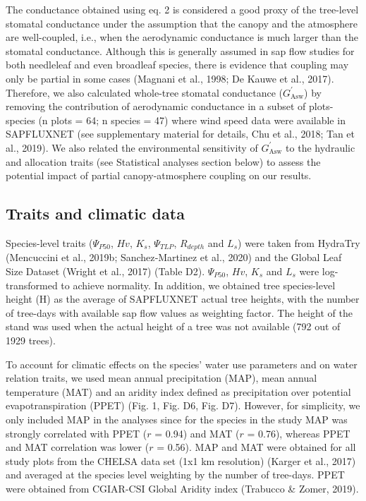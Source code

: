 \documentclass[11pt,twoside]{reedthesis}
\begin{document}
The conductance obtained using eq. 2 is considered a good proxy of the
tree-level stomatal conductance under the assumption that the canopy and
the atmosphere are well-coupled, i.e., when the aerodynamic conductance
is much larger than the stomatal conductance. Although this is generally
assumed in sap flow studies for both needleleaf and even broadleaf
species, there is evidence that coupling may only be partial in some
cases (Magnani et al., 1998; De Kauwe et al., 2017). Therefore, we also
calculated whole-tree stomatal conductance (\(G_{\text{Asw}}^{'}\)) by
removing the contribution of aerodynamic conductance in a subset of
plots-species (n plots = 64; n species = 47) where wind speed data were
available in SAPFLUXNET (see supplementary material for details, Chu et
al., 2018; Tan et al., 2019). We also related the environmental
sensitivity of \(G_{\text{Asw}}^{'}\) to the hydraulic and allocation
traits (see Statistical analyses section below) to assess the potential
impact of partial canopy-atmosphere coupling on our results.\par

\subsection{Traits and climatic data}\label{traits-and-climatic-data}

Species-level traits (\textbar{}\(\Psi_{P50}\)\textbar{}, \(Hv\),
\(K_s\), \textbar{}\(\Psi_{TLP}\)\textbar{}, \(R_{depth}\) and \(L_s\))
were taken from HydraTry (Mencuccini et al., 2019b; Sanchez‐Martinez et
al., 2020) and the Global Leaf Size Dataset (Wright et al., 2017) (Table
D2). \textbar{}\(\Psi_{P50}\)\textbar{}, \(Hv\), \(K_s\) and \(L_s\)
were log-transformed to achieve normality. In addition, we obtained tree
species-level height (H) as the average of SAPFLUXNET actual tree
heights, with the number of tree-days with available sap flow values as
weighting factor. The height of the stand was used when the actual
height of a tree was not available (792 out of 1929 trees).\par

To account for climatic effects on the species' water use parameters and
on water relation traits, we used mean annual precipitation (MAP), mean
annual temperature (MAT) and an aridity index defined as precipitation
over potential evapotranspiration (PPET) (Fig. 1, Fig. D6, Fig. D7).
However, for simplicity, we only included MAP in the analyses since for
the species in the study MAP was strongly correlated with PPET (\(r\) =
0.94) and MAT (\(r\) = 0.76), whereas PPET and MAT correlation was lower
(\(r\) = 0.56). MAP and MAT were obtained for all study plots from the
CHELSA data set (1x1 km resolution) (Karger et al., 2017) and averaged
at the species level weighting by the number of tree-days. PPET were
obtained from CGIAR-CSI Global Aridity index (Trabucco \& Zomer,
2019).\par
\end{document}
